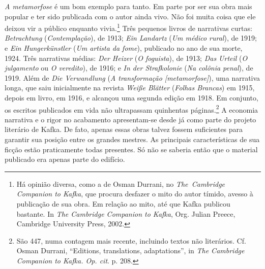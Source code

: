 \textit{A metamorfose} é um bom exemplo para tanto. Em parte por ser sua
obra mais popular e ter sido publicada com o autor ainda vivo. Não
foi muita coisa que ele deixou vir a público enquanto vivia.\footnote{
Há opinião diversa, como a de Osman Durrani, no \textit{\mbox{The Cambridge}
Companion to Kafka}, que procura desfazer o mito do autor tímido, avesso à
publicação de sua obra. Em relação ao mito, até que Kafka publicou
bastante. In \textit{The Cambridge
Companion to Kafka}, Org. Julian Preece, Cambridge University Press,
2002.} Três pequenos livros de narrativas curtas:
\textit{Betrachtung} (\textit{Contemplação}), de 1913; \textit{Ein
Landartz} (\textit{Um médico rural}), de 1919; e \textit{Ein
Hungerkünstler} (\textit{Um artista da fome}), publicado no ano de sua
morte, 1924. Três narrativas médias: \textit{Der Heizer} (\textit{O
foguista}), de 1913; \textit{Das Urteil} (\textit{O julgamento} ou
\textit{O veredito}), de 1916; e \textit{In der Strafkolonie}
(\textit{Na colônia penal}), de 1919. Além de \textit{Die Verwandlung}
(\textit{A transformação [metamorfose]}), uma narrativa
longa, que saiu inicialmente na revista \textit{Weiße Blätter}
(\textit{Folhas Brancas}) em 1915, depois em livro, em 1916, e alcançou
uma segunda edição em 1918. Em conjunto, os escritos publicados em vida
não ultrapassam quinhentas páginas.\footnote{ São 447, numa contagem
mais recente, incluindo textos não literários. Cf. Osman Durrani,
“Editions, translations, adaptations”, in \textit{The Cambridge
Companion to Kafka. Op. cit}. p. 208.} A economia narrativa e o rigor no acabamento
apresentam-se desde já como parte do projeto literário de Kafka. De
fato, apenas essas obras talvez fossem suficientes para garantir sua
posição entre os grandes mestres. As principais características de sua
ficção estão praticamente todas presentes. Só não se saberia então que
o material publicado era apenas parte do edifício.

